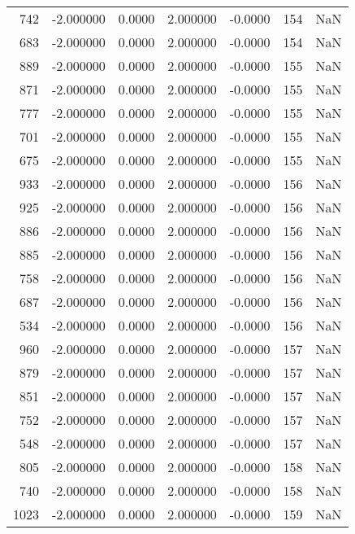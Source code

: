 \begin{tabular}{rrrrrrr}
 742 &   -2.000000 &    0.0000 &    2.000000 &     -0.0000 &         154 & NaN \\
 683 &   -2.000000 &    0.0000 &    2.000000 &     -0.0000 &         154 & NaN \\
 889 &   -2.000000 &    0.0000 &    2.000000 &     -0.0000 &         155 & NaN \\
 871 &   -2.000000 &    0.0000 &    2.000000 &     -0.0000 &         155 & NaN \\
 777 &   -2.000000 &    0.0000 &    2.000000 &     -0.0000 &         155 & NaN \\
 701 &   -2.000000 &    0.0000 &    2.000000 &     -0.0000 &         155 & NaN \\
 675 &   -2.000000 &    0.0000 &    2.000000 &     -0.0000 &         155 & NaN \\
 933 &   -2.000000 &    0.0000 &    2.000000 &     -0.0000 &         156 & NaN \\
 925 &   -2.000000 &    0.0000 &    2.000000 &     -0.0000 &         156 & NaN \\
 886 &   -2.000000 &    0.0000 &    2.000000 &     -0.0000 &         156 & NaN \\
 885 &   -2.000000 &    0.0000 &    2.000000 &     -0.0000 &         156 & NaN \\
 758 &   -2.000000 &    0.0000 &    2.000000 &     -0.0000 &         156 & NaN \\
 687 &   -2.000000 &    0.0000 &    2.000000 &     -0.0000 &         156 & NaN \\
 534 &   -2.000000 &    0.0000 &    2.000000 &     -0.0000 &         156 & NaN \\
 960 &   -2.000000 &    0.0000 &    2.000000 &     -0.0000 &         157 & NaN \\
 879 &   -2.000000 &    0.0000 &    2.000000 &     -0.0000 &         157 & NaN \\
 851 &   -2.000000 &    0.0000 &    2.000000 &     -0.0000 &         157 & NaN \\
 752 &   -2.000000 &    0.0000 &    2.000000 &     -0.0000 &         157 & NaN \\
 548 &   -2.000000 &    0.0000 &    2.000000 &     -0.0000 &         157 & NaN \\
 805 &   -2.000000 &    0.0000 &    2.000000 &     -0.0000 &         158 & NaN \\
 740 &   -2.000000 &    0.0000 &    2.000000 &     -0.0000 &         158 & NaN \\
1023 &   -2.000000 &    0.0000 &    2.000000 &     -0.0000 &         159 & NaN \\

\end{tabular}
